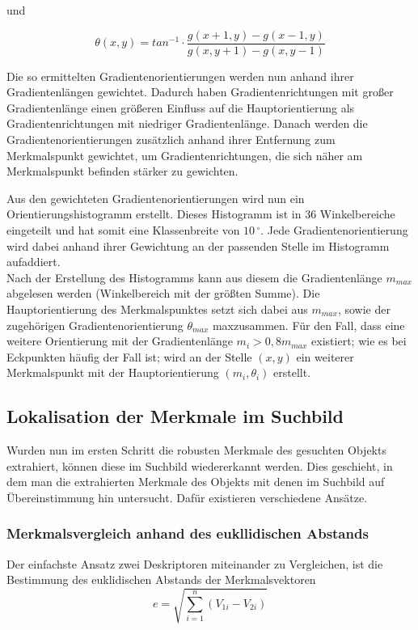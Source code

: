 und

\begin{equation*}
\theta (x, y) = tan^{-1}\cdot \frac{g(x +1, y) - g(x-1, y)}{g(x, y +1) - g(x, y-1)}
\end{equation*}

Die so ermittelten Gradientenorientierungen werden nun anhand ihrer Gradientenlängen gewichtet. Dadurch haben Gradientenrichtungen mit großer Gradientenlänge einen größeren Einfluss auf die Hauptorientierung als Gradientenrichtungen mit niedriger Gradientenlänge.
Danach werden die Gradientenorientierungen zusätzlich anhand ihrer Entfernung zum Merkmalspunkt gewichtet, um Gradientenrichtungen, die sich näher am Merkmalspunkt befinden stärker zu gewichten.

Aus den gewichteten Gradientenorientierungen wird nun ein Orientierungshistogramm erstellt. Dieses Histogramm ist in 36 Winkelbereiche eingeteilt und hat somit eine Klassenbreite von $10\,^{\circ}$.
Jede Gradientenorientierung wird dabei anhand ihrer Gewichtung an der passenden Stelle im Histogramm aufaddiert. \\
Nach der Erstellung des Histogramms kann aus diesem die Gradientenlänge $m_{max}$ abgelesen werden (Winkelbereich mit der größten Summe). Die Hauptorientierung des Merkmalspunktes  setzt sich dabei aus $m_{max}$, sowie der zugehörigen Gradientenorientierung $\theta_{max}$ maxzusammen.
Für den Fall, dass eine weitere Orientierung mit der Gradientenlänge $m_i > 0,8 m_{max}$
existiert; wie es bei Eckpunkten häufig der Fall ist; wird an der Stelle $(x, y)$ ein weiterer Merkmalspunkt mit der Hauptorientierung $(m_i, \theta_i)$ erstellt.
\subsection{Lokalisation der Merkmale im Suchbild}
Wurden nun im ersten Schritt die robusten Merkmale des gesuchten Objekts extrahiert, können diese im Suchbild wiedererkannt werden.
Dies geschieht, in dem man die extrahierten Merkmale des Objekts mit denen im Suchbild auf Übereinstimmung hin untersucht.
Dafür existieren verschiedene Ansätze.
	\subsubsection{Merkmalsvergleich anhand des eukllidischen Abstands}
Der einfachste Ansatz zwei Deskriptoren miteinander zu Vergleichen, ist die Bestimmung des euklidischen Abstands der Merkmalsvektoren
\begin{equation*}
e = \sqrt{\sum_{i = 1}^{n}(V_{1i} - V_{2i})}
\end{equation*}


